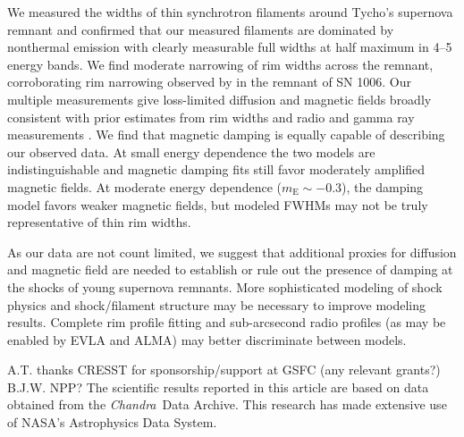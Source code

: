 \documentclass[iop, apj, numberedappendix]{emulateapj}
\newcommand*{\mt}{\mathrm}
\newcommand*{\Chandra}{\textit{Chandra}\ }
\newcommand*{\mE}{m_\mt{E}}
\begin{document}
We measured the widths of thin synchrotron filaments around Tycho's supernova
remnant and confirmed that our measured filaments are dominated by nonthermal
emission with clearly measurable full widths at half maximum in 4--5 energy
bands.  We find moderate narrowing of rim widths across the remnant,
corroborating rim narrowing observed by \citet{ressler2014} in the remnant of
SN 1006.  Our multiple measurements give loss-limited diffusion and magnetic fields
broadly consistent with prior estimates from rim widths
\citep[e.g.,][]{parizot2006, rettig2012} and radio and gamma ray measurements
\citep{acciari2011, morlino2012}.  We find that magnetic damping is equally
capable of describing our observed data.  At small energy dependence the two
models are indistinguishable and magnetic damping fits still favor moderately
amplified magnetic fields.  At moderate energy dependence ($\mE \sim -0.3$),
the damping model favors weaker magnetic fields, but modeled FWHMs may not
be truly representative of thin rim widths.

As our data are not count limited, we suggest that additional proxies for
diffusion and magnetic field are needed to establish or rule out the presence
of damping at the shocks of young supernova remnants.  More sophisticated
modeling of shock physics \citep[e.g.,][]{zirakashvili2014} and shock/filament
structure \citep[cf.][]{caprioli2013} may be necessary to improve modeling
results.  Complete rim profile fitting and sub-arcsecond radio profiles (as may
be enabled by EVLA and ALMA) may better discriminate between models.


\acknowledgments

A.T. thanks CRESST for sponsorship/support at GSFC (any relevant grants?)
B.J.W. NPP?
The scientific results reported in this article are based on data obtained from
the \Chandra Data Archive.
This research has made extensive use of NASA's Astrophysics Data System.
\end{document}
